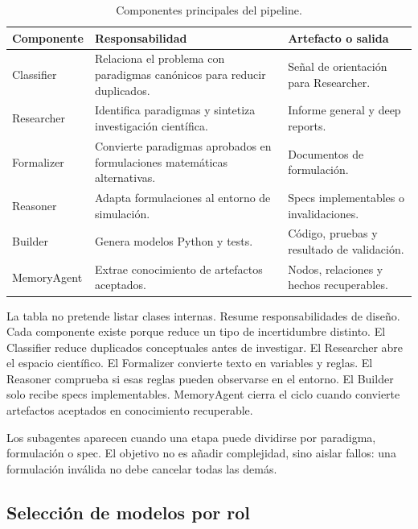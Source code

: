 \begin{table}[H]
\begin{center}
\small
\begin{tabular}{|p{2.8cm}|p{5.1cm}|p{4.4cm}|} \hline
\textbf{Componente} & \textbf{Responsabilidad} & \textbf{Artefacto o salida} \\ \hline
Classifier & Relaciona el problema con paradigmas canónicos para reducir duplicados. & Señal de orientación para Researcher. \\ \hline
Researcher & Identifica paradigmas y sintetiza investigación científica. & Informe general y deep reports. \\ \hline
Formalizer & Convierte paradigmas aprobados en formulaciones matemáticas alternativas. & Documentos de formulación. \\ \hline
Reasoner & Adapta formulaciones al entorno de simulación. & Specs implementables o invalidaciones. \\ \hline
Builder & Genera modelos Python y tests. & Código, pruebas y resultado de validación. \\ \hline
MemoryAgent & Extrae conocimiento de artefactos aceptados. & Nodos, relaciones y hechos recuperables. \\ \hline
\end{tabular}
\caption{Componentes principales del pipeline.}
\end{center}
\end{table}

La tabla no pretende listar clases internas. Resume responsabilidades de diseño.
Cada componente existe porque reduce un tipo de incertidumbre distinto. El
Classifier reduce duplicados conceptuales antes de investigar. El Researcher
abre el espacio científico. El Formalizer convierte texto en variables y reglas.
El Reasoner comprueba si esas reglas pueden observarse en el entorno. El Builder
solo recibe specs implementables. MemoryAgent cierra el ciclo cuando convierte
artefactos aceptados en conocimiento recuperable.

Los subagentes aparecen cuando una etapa puede dividirse por paradigma,
formulación o spec. El objetivo no es añadir complejidad, sino aislar fallos:
una formulación inválida no debe cancelar todas las demás.

\subsection{Selección de modelos por rol}
\label{subsec:modelos-por-rol}

